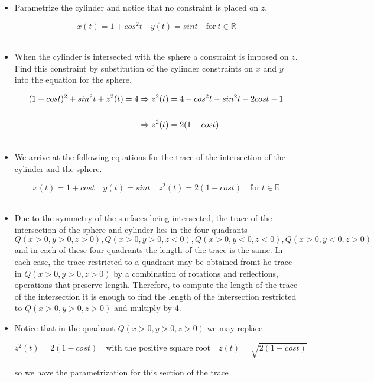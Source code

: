 \documentclass[12pt,letterpaper]{hmcpset}
\begin{document}
\begin{solution}

\begin{itemize}

\item Parametrize the cylinder and notice that no constraint is placed on $z$.

\[ x(t) = 1+ cos^2t \quad y(t) = sint \quad \text{for} \ t \in \mathbb{R}\]\

\item  When the cylinder is intersected with the sphere a constraint is imposed on $z$.  Find this constraint by substitution of the cylinder constraints on $x$ and $y$ into the equation for the sphere.

\begin{align}
(1+cost)^2 + sin^2t + z^2(t) = 4 &\Rightarrow z^2(t) = 4 - cos^2t - sin^2t - 2cost -1 \notag\\
&\quad\notag\\
&\Rightarrow z^2(t) = 2(1-cost)\notag\\
\notag
\end{align}

\item  We arrive at the following equations for the trace of the  intersection of the cylinder and the sphere.

\[ x(t) = 1+cost \quad y(t) = sint \quad z^2(t) = 2(1-cost)\quad \text{for} \ t \in \mathbb{R}\]\

\item Due to the symmetry of the surfaces being intersected, the trace of the intersection of the sphere and cylinder lies in the four quadrants $Q(x>0, y>0,z>0), Q(x>0,y>0,z<0), Q(x>0,y<0,z<0), Q(x>0,y<0,z>0)$ and
in each of these four quadrants the length of the trace is the same.  In each case, the trace restricted to a quadrant may be obtained fromt he trace in $Q(x>0, y>0,z>0)$ by a combination of rotations and reflections, operations that preserve length. 
Therefore, to compute the length of the trace of the intersection it is enough to find the length of the intersection restricted to $Q(x>0, y>0,z>0)$ and multiply by 4.

\item  Notice that in the quadrant $Q(x>0, y>0,z>0)$  we may replace 

\[z^2(t) = 2(1-cost)\quad \text{with the positive square root} \quad z(t) = \sqrt{2(1-cost)}\]

so we have  the parametrization for this section of the trace 


\end{itemize}
\end{solution}
\end{document}
